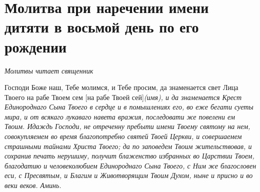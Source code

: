 \section{Молитва при наречении имени дитяти в восьмой день по его рождении}\begin{mymulticols}



\itshape Молитвы читает священник\normalfont{}

Господи Боже наш, Тебе молимся, и Тебе просим, да знаменается свет Лица Твоего на рабе Твоем сем [на рабе Твоей сей]\itshape  (имя)\normalfont{}, и да знаменается Крест Единороднаго Сына Твоего в сердце и в помышлениях его, во еже бегати суеты мира, и от всякаго лукаваго навета вражия, последовати же повелени ем Твоим. Идаждь Господи, не отреченну пребыти имени Твоему святому на нем, совокупляемем во время благопотребно святей Твоей Церкви, и совершаемем страшными тайнами Христа Твоего; да по заповедем Твоим жительствовав, и сохранив печать нерушиму, получит блаженство избранных во Царствии Твоем, благодатию и человеколюбием Единороднаго Сына Твоего, с Ним же благословен еси, с Пресвятым, и Благим и Животворящим Твоим Духом, ныне и присно и во веки веков. Аминь.


\end{mymulticols}

